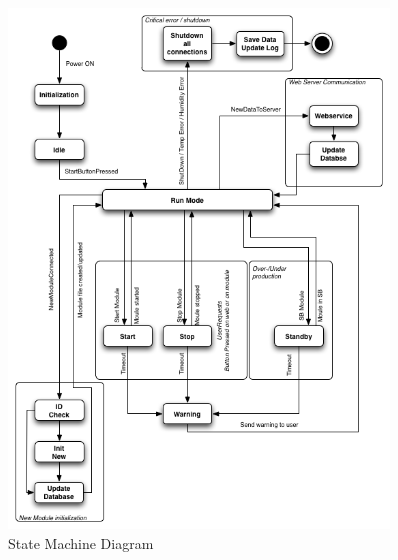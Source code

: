 	\begin{figure}[H]
		\begin{centering}
			 \includegraphics[width=0.9\textwidth]{images/statemachine.png}
		\caption{State Machine Diagram}
	 	\end{centering}
	\end{figure}
